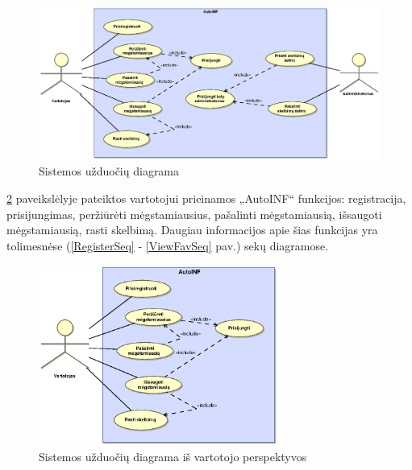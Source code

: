 \documentclass[12pt]{article}
\begin{document}
	\begin{figure}[h]
		\begin{center}
			\includegraphics[width=\textwidth]{Tikslai.eps}
			\caption{Sistemos užduočių diagrama\label{UseCase}}
		\end{center}
	\end{figure}
	
	\pagebreak

	\ref{UseCaseUser} paveikslėlyje pateiktos vartotojui prieinamos „AutoINF“ funkcijos: registracija, prisijungimas, peržiūrėti mėgstamiausius, pašalinti mėgstamiausią, išsaugoti mėgstamiausią, rasti skelbimą. Daugiau informacijos apie šias funkcijas yra tolimesnėse (\ref{RegisterSeq} - \ref{ViewFavSeq} pav.) sekų diagramose.
	
	\begin{figure}[h]
		\begin{center}
			\includegraphics[width=0.7\textwidth]{TikslaiVartotojas.eps}
			\caption{Sistemos užduočių diagrama iš vartotojo perspektyvos\label{UseCaseUser}}
		\end{center}
	\end{figure}
	
\end{document}

